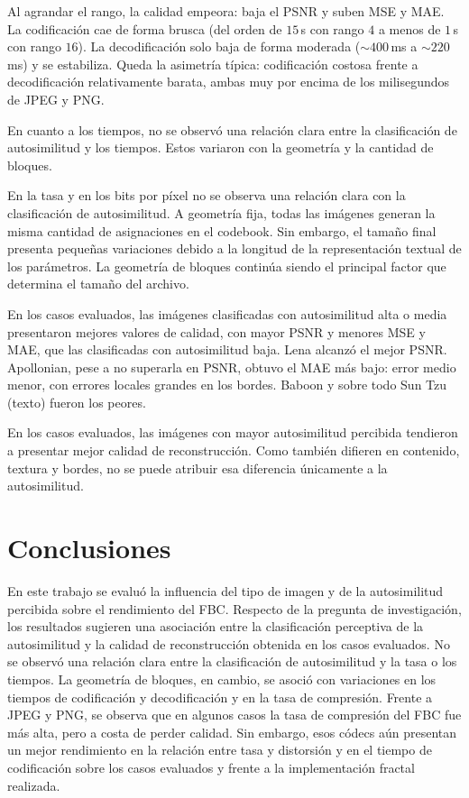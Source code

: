 \documentclass[a4paper]{llncs}
\begin{document}
Al agrandar el rango, la calidad empeora: baja el PSNR y suben MSE y MAE. La codificación cae de forma brusca (del orden de $15$\,s con rango $4$ a menos de $1$\,s con rango $16$). La decodificación solo baja de forma moderada ($\sim 400$\,ms a $\sim 220$\,ms) y se estabiliza. Queda la asimetría típica: codificación costosa frente a decodificación relativamente barata, ambas muy por encima de los milisegundos de JPEG y PNG.

En cuanto a los tiempos, no se observó una relación clara entre la clasificación de autosimilitud y los tiempos. Estos variaron con la geometría y la cantidad de bloques.

En la tasa y en los bits por píxel no se observa una relación clara con la clasificación de autosimilitud. A geometría fija, todas las imágenes generan la misma cantidad de asignaciones en el codebook. Sin embargo, el tamaño final presenta pequeñas variaciones debido a la longitud de la representación textual de los parámetros. La geometría de bloques continúa siendo el principal factor que determina el tamaño del archivo.

En los casos evaluados, las imágenes clasificadas con autosimilitud alta o media presentaron mejores valores de calidad, con mayor PSNR y menores MSE y MAE, que las clasificadas con autosimilitud baja. Lena alcanzó el mejor PSNR. Apollonian, pese a no superarla en PSNR, obtuvo el MAE más bajo: error medio menor, con errores locales grandes en los bordes. Baboon y sobre todo Sun Tzu (texto) fueron los peores.

En los casos evaluados, las imágenes con mayor autosimilitud percibida tendieron a presentar mejor calidad de reconstrucción. Como también difieren en contenido, textura y bordes, no se puede atribuir esa diferencia únicamente a la autosimilitud.


\section{Conclusiones}
\label{sec:conclusiones}

En este trabajo se evaluó la influencia del tipo de imagen y de la autosimilitud percibida sobre el rendimiento del FBC. Respecto de la pregunta de investigación, los resultados sugieren una asociación entre la clasificación perceptiva de la autosimilitud y la calidad de reconstrucción obtenida en los casos evaluados. No se observó una relación clara entre la clasificación de autosimilitud y la tasa o los tiempos. La geometría de bloques, en cambio, se asoció con variaciones en los tiempos de codificación y decodificación y en la tasa de compresión. Frente a JPEG y PNG, se observa que en algunos casos la tasa de compresión del FBC fue más alta, pero a costa de perder calidad. Sin embargo, esos códecs aún presentan un mejor rendimiento en la relación entre tasa y distorsión y en el tiempo de codificación sobre los casos evaluados y frente a la implementación fractal realizada.
\end{document}
